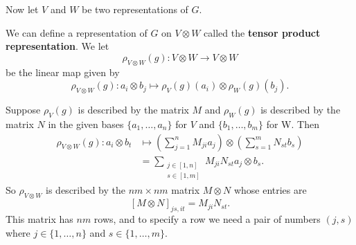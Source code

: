 Now let $V$ and $W$ be two representations of $G$.
\begin{defn}
We can define a representation of $G$ on $V \otimes W$ called the \textbf{tensor product representation}. We let
\[ \rho_{V \otimes W} (g) \colon V \otimes W \to V \otimes W \]
be the linear map given by
\[ \rho_{V \otimes W} (g) \colon a_i \otimes b_j \mapsto \rho_V (g) (a_i) \otimes \rho_W (g) (b_j).\]
\end{defn}
Suppose $\rho_V (g)$ is described by the matrix $M$ and 
$\rho_W (g)$ is described by the matrix $N$ in the given bases $\{ a_1, \ldots, a_n\}$ for $V$  and $\{b_1, \ldots, b_m \}$ for W.  Then
\begin{align*}
\rho_{V \otimes W} (g) \colon a_i \otimes b_t &\mapsto \left( \sum_{j=1}^n M_{ji} a_j \right) \otimes \left( \sum_{s=1}^m N_{st} b_s \right) \\
&= \sum_{\substack{j \in [1,n] \\  s \in [1,m]}} M_{ji} N_{st} a_j \otimes b_s.
\end{align*}
So $\rho_{V \otimes W}$ is described by the $nm \times nm$ matrix $M \otimes N$ whose entries are 
\[ [ M \otimes N ]_{js, it} = M_{ji} N_{st}. \]
This matrix has $nm$ rows, and to specify a row we need a pair of numbers $(j, s)$ where $j \in \{ 1, \ldots, n \}$ and $s \in \{ 1, \ldots, m \}$.  

